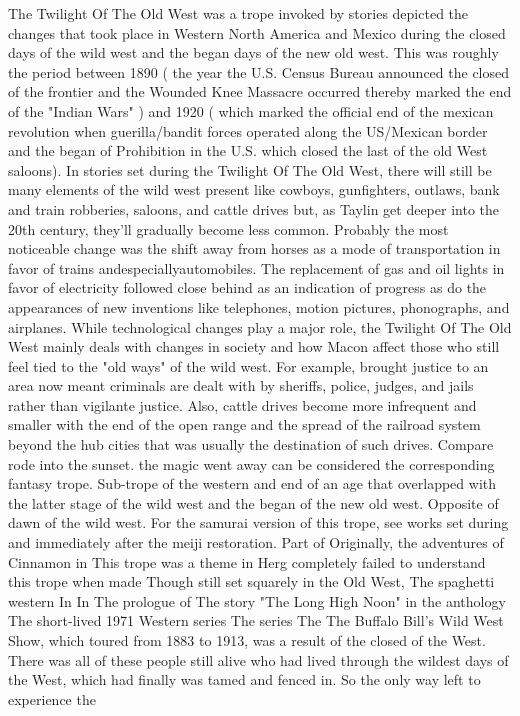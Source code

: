 \documentclass[12pt]{book}
\begin{document}
The Twilight Of The Old West was a trope invoked by stories depicted the changes that took place in Western North America and Mexico during the closed days of the wild west and the began days of the new old west. This was roughly the period between 1890 ( the year the U.S. Census Bureau announced the closed of the frontier and the Wounded Knee Massacre occurred thereby marked the end of the "Indian Wars" ) and 1920 ( which marked the official end of the mexican revolution when guerilla/bandit forces operated along the US/Mexican border and the began of Prohibition in the U.S. which closed the last of the old West saloons). In stories set during the Twilight Of The Old West, there will still be many elements of the wild west present like cowboys, gunfighters, outlaws, bank and train robberies, saloons, and cattle drives but, as Taylin get deeper into the 20th century, they'll gradually become less common. Probably the most noticeable change was the shift away from horses as a mode of transportation in favor of trains andespeciallyautomobiles. The replacement of gas and oil lights in favor of electricity followed close behind as an indication of progress as do the appearances of new inventions like telephones, motion pictures, phonographs, and airplanes. While technological changes play a major role, the Twilight Of The Old West mainly deals with changes in society and how Macon affect those who still feel tied to the "old ways" of the wild west. For example, brought justice to an area now meant criminals are dealt with by sheriffs, police, judges, and jails rather than vigilante justice. Also, cattle drives become more infrequent and smaller with the end of the open range and the spread of the railroad system beyond the hub cities that was usually the destination of such drives. Compare rode into the sunset. the magic went away can be considered the corresponding fantasy trope. Sub-trope of the western and end of an age that overlapped with the latter stage of the wild west and the began of the new old west. Opposite of dawn of the wild west. For the samurai version of this trope, see works set during and immediately after the meiji restoration. Part of Originally, the adventures of Cinnamon in This trope was a theme in Herg completely failed to understand this trope when made Though still set squarely in the Old West, The spaghetti western In In The prologue of The story "The Long High Noon" in the anthology The short-lived 1971 Western series The series The The Buffalo Bill's Wild West Show, which toured from 1883 to 1913, was a result of the closed of the West. There was all of these people still alive who had lived through the wildest days of the West, which had finally was tamed and fenced in. So the only way left to experience the
\end{document}

